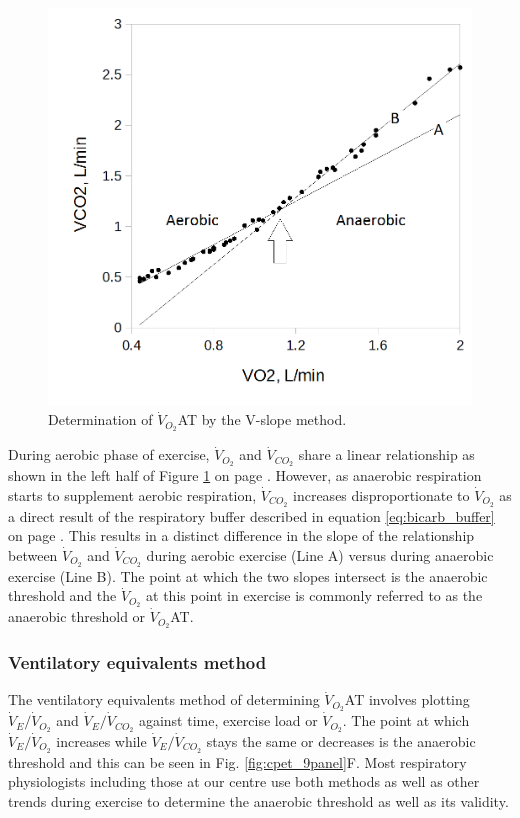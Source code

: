 \begin{figure}[htbp]
	\centering
	\includegraphics[width=\textwidth]{Figures/cpet_vslope}
	\caption{Determination of $\dot{V}_{O_2}$AT by the V-slope method.}
	\label{fig:cpet_vslope}
\end{figure}

During aerobic phase of exercise, $\dot{V}_{O_2}$ and $\dot{V}_{CO_2}$ share a linear relationship as shown in the left half of Figure \ref{fig:cpet_vslope} on page \pageref{fig:cpet_vslope}. 
However, as anaerobic respiration starts to supplement aerobic respiration, $\dot{V}_{CO_2}$ increases disproportionate to $\dot{V}_{O_2}$ as a direct result of the respiratory buffer described in equation \ref{eq:bicarb_buffer} on page \pageref{eq:bicarb_buffer}. 
This results in a distinct difference in the slope of the relationship between $\dot{V}_{O_2}$ and $\dot{V}_{CO_2}$ during aerobic exercise (Line A) versus during anaerobic exercise (Line B). 
The point at which the two slopes intersect is the anaerobic threshold and the $\dot{V}_{O_2}$ at this point in exercise is commonly referred to as the anaerobic threshold or $\dot{V}_{O_2}$AT.

\subsubsection{Ventilatory equivalents method}
The ventilatory equivalents method of determining $\dot{V}_{O_2}$AT involves plotting $\dot{V}_E/\dot{V}_{O_2}$
and $\dot{V}_E/\dot{V}_{CO_2}$ against time, exercise load or $\dot{V}_{O_2}$. 
The point at which $\dot{V}_E/\dot{V}_{O_2}$ increases while $\dot{V}_E/\dot{V}_{CO_2}$ stays the same or decreases is the anaerobic threshold and this can be seen in Fig. \ref{fig:cpet_9panel}F. 
Most respiratory physiologists including those at our centre use both methods as well as other trends during exercise to determine the anaerobic threshold as well as its validity.



